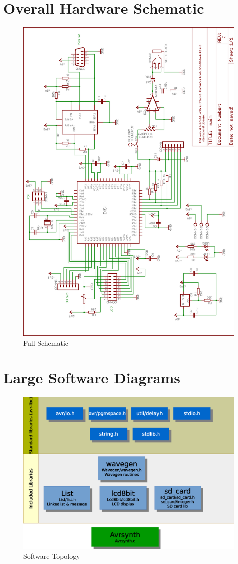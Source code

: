 \documentclass[bibtotocnumbered,abstract=on,paper=a4,fontsize=12pt,parskip=on,halfparskip=on]{scrartcl}		%
\begin{document}
\section{Overall Hardware Schematic}
    \begin{figure}[H]
      \centering
        \includegraphics[width=0.9\linewidth]{img/fig_full_schematic}
        \caption{Full Schematic}
    \end{figure}
    \clearpage
\section{Large Software Diagrams}
    \begin{figure}[H]
      \centering
        \includegraphics[width=\linewidth]{img/fig_soft_diag}
        \caption{Software Topology}
    \end{figure}
    \clearpage
\end{document}
